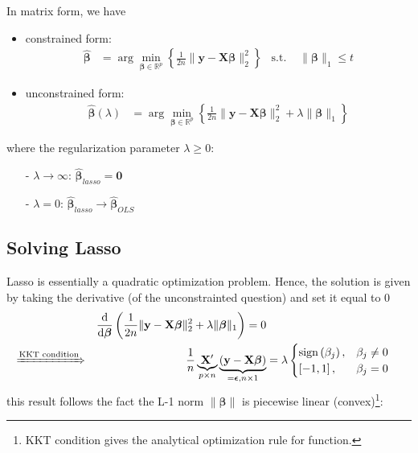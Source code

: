 \documentclass[twoside]{article}
\begin{document}
In matrix form, we have
\begin{itemize}
    \item constrained form:
    \begin{align*}
        \hat{\boldsymbol{\beta}} &= \arg\min_{\boldsymbol{\beta}\in \mathbb{R}^p}\left\{ \frac{1}{2n} \lVert \mathbf{y}-\mathbf{X}\boldsymbol{\beta} \rVert^2_2 \right\} & \text{s.t.\ } & \lVert \boldsymbol{\beta} \rVert_1 \leq t
    \end{align*}
    \item unconstrained form:
    \begin{align*}
        \hat{\boldsymbol{\beta}}(\lambda) &= \arg\min_{\boldsymbol{\beta}\in \mathbb{R}^p}\left\{ \frac{1}{2n} \lVert \mathbf{y}-\mathbf{X}\boldsymbol{\beta} \rVert^2_2 +\lambda \lVert \boldsymbol{\beta} \rVert_1 \right\}
    \end{align*}
\end{itemize}
where the regularization parameter $\lambda \geq 0$:
\begin{itemize}
    \item[-] $\lambda \rightarrow \infty$: $\hat{\boldsymbol{\beta}}_{lasso}=\mathbf{0}$
    \item[-] $\lambda = 0$: $\hat{\boldsymbol{\beta}}_{lasso} \rightarrow\hat{\boldsymbol{\beta}}_{OLS}$
\end{itemize}

\subsection{Solving Lasso}
Lasso is essentially a quadratic optimization problem. Hence, the solution is given by taking the derivative (of the unconstrainted question) and set it equal to 0
\begin{align*}
   && \frac{\mathrm{d}}{\mathrm{d}\boldsymbol{\beta}} \left( \frac{1}{2n} \lVert \mathbf{y}-\mathbf{X}\boldsymbol{\beta} \rVert^2_2 +\lambda \lVert \boldsymbol{\beta} \rVert_1 \right) = 0 \\
   \xRightarrow{\text{KKT condition}} && \frac{1}{n} \underbrace{\mathbf{X}'}_{p\times n} \underbrace{ \left(\mathbf{y}-\mathbf{X}\boldsymbol{\beta} \right)}_{=\boldsymbol{\epsilon}, n \times 1} &= \lambda \begin{cases}
    \mathrm{sign}\left(\beta_j\right), & \beta_j\neq 0\\
    \left[ -1,1 \right], & \beta_j =0
   \end{cases}
\end{align*}
this result follows the fact the L-1 norm $\lVert \boldsymbol{\beta} \rVert$ is piecewise linear (convex)\footnote{KKT condition gives the analytical optimization rule for  function.}:
\end{document}
